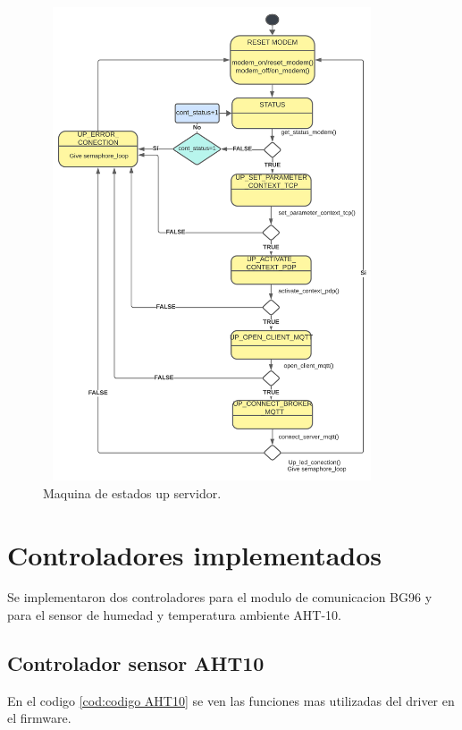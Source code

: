 \begin{figure}[t!]
  \centering
	\includegraphics[width=10cm, height=14cm]{./Figures/SM up server.png}
	\caption{Maquina de estados up servidor.}
	\label{fig:Maquina de estados up servidor}
\end{figure}

\section{Controladores implementados}
Se implementaron dos controladores para el modulo de comunicacion BG96 y para el sensor de humedad y temperatura ambiente AHT-10.

\subsection{Controlador sensor AHT10} 
En el codigo \ref{cod:codigo AHT10} se ven las funciones mas utilizadas del driver en el firmware.

